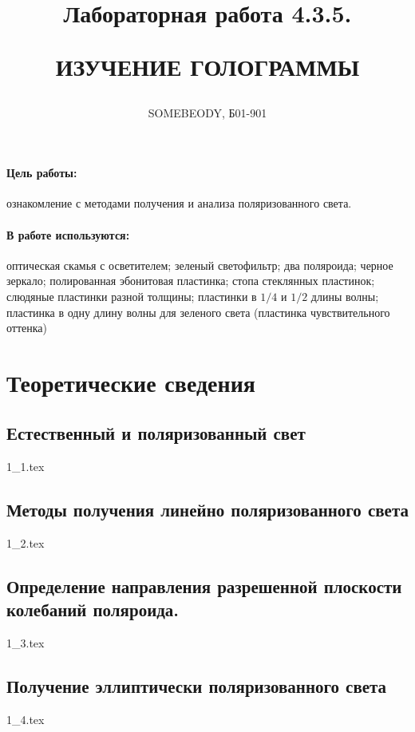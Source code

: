 \documentclass[a5paper,10pt, twoside]{article} %
\title
{
\hfill \break	\hfill \break
\hfill \break	\hfill \break
Лабораторная работа 4.3.5.

ИЗУЧЕНИЕ ГОЛОГРАММЫ
}
\author{SOMEBEODY, Б01-901}
\begin{document}
\maketitle


\thispagestyle{empty} %

\newpage

\tableofcontents %
\thispagestyle{plain}
\newpage


\paragraph{Цель работы:}

ознакомление с методами получения и анализа поляризованного света.

\paragraph{В работе используются:}

оптическая скамья с осветителем; зеленый светофильтр; два поляроида; черное зеркало; 
полированная эбонитовая пластинка; стопа стеклянных пластинок; слюдяные пластинки 
разной толщины; пластинки в $1/4$ и $1/2$ длины волны; пластинка в одну длину волны для 
зеленого света (пластинка чувствительного оттенка)

\section{Теоретические сведения}

  \subsection{Естественный и поляризованный свет}
  {1_1.tex}

  \subsection{Методы получения линейно поляризованного света}
  {1_2.tex}

  \subsection{Определение направления разрешенной плоскости колебаний поляроида.}
  {1_3.tex}

  \subsection{Получение эллиптически поляризованного света}
  {1_4.tex}
\end{document}
